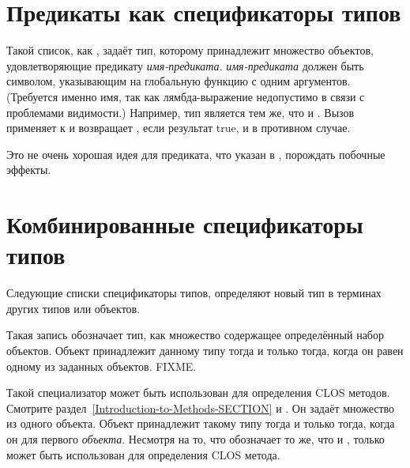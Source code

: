 \section{Предикаты как спецификаторы типов}
\label{PREDICATING-TYPE-SPECIFIERS-SECTION}

Такой список, как , задаёт тип, которому
принадлежит множество объектов, удовлетворяющие предикату {\it
  имя-предиката}. \emph{имя-предиката} должен быть символом, указывающим на
глобальную функцию с одним аргументов.
(Требуется именно имя, так как лямбда-выражение недопустимо в связи с проблемами
видимости.) Например, тип  является тем же, что и
.
Вызов  применяет  к  и возвращает
, если результат true, и {\nil} в противном случае.

Это не очень хорошая идея для предиката, что указан в , порождать
побочные эффекты.

\section{Комбинированные спецификаторы типов}

Следующие списки спецификаторы типов, определяют новый тип в терминах других типов
или объектов.

\begin{flushdesc}
\item[\cd{(member \emph{object1} \emph{object2} ...)}]

Такая запись обозначает тип, как множество содержащее определённый набор объектов. Объект
принадлежит данному типу тогда и только тогда, когда он равен  одному из
заданных объектов. FIXME.
\end{flushdesc}

\begin{newer}
\begin{flushdesc}
\item[\cd{(eql \emph{object})}]

Такой специализатор может быть использован для определения CLOS
методов. Смотрите раздел~\ref{Introduction-to-Methods-SECTION} и
.
Он задаёт множество из одного объекта. Объект принадлежит такому типу тогда и
только тогда, когда он  для первого \emph{объекта}. Несмотря на то, что
 обозначает то же, что и ,
только  может быть использован для определения CLOS метода.
\end{flushdesc}
\end{newer}

